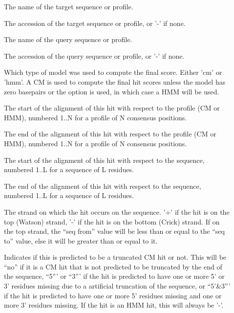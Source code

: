 \begin{description}
\item[]
  The name of the target sequence or profile. 

\item[]
  The accession of the target sequence or profile, or '-' if none.

\item[] 
  The name of the query sequence or profile.

\item[]
  The accession of the query sequence or profile, or '-' if none.

\item[] Which type of model was used to
  compute the final score. Either 'cm' or 'hmm'. A CM is
  used to compute the final hit scores unless the model has zero
  basepairs or the  option is used, in which case a
  HMM will be used. 

\item[]
  The start of the alignment of this hit with respect to the
  profile (CM or HMM), numbered 1..N for a profile of N consensus positions.

\item[]
  The end of the alignment of this hit with respect to the
  profile (CM or HMM), numbered 1..N for a profile of N consensus positions.

\item[]
  The start of the alignment of this hit with respect to the
  sequence, numbered 1..L for a sequence of L residues.
 
\item[]
  The end of the alignment of this hit with respect to the
  sequence, numbered 1..L for a sequence of L residues.

\item[]
  The strand on which the hit occurs on the sequence. '+' if the hit is on
  the top (Watson) strand, '-' if the hit is on the bottom (Crick) strand.
  If on the top strand, the ``seq from'' value will be less than or
  equal to the ``seq to'' value, else it will be greater than or equal
  to it. 

\item[] 
  Indicates if this is predicted to be a truncated CM hit or not. This will be
  ``no'' if it is a CM hit that is not predicted to be truncated by the end of the
  sequence, ``5''' or ``3''' if the hit is predicted to have one or more
  5' or 3' residues missing  due to a artificial truncation of the
  sequence, or ``5'&3''' if the hit is predicted to have one or more
  5' residues missing and one or more 3' residues missing.
  If the hit is an HMM hit, this will always be '-'. 


\end{description}

